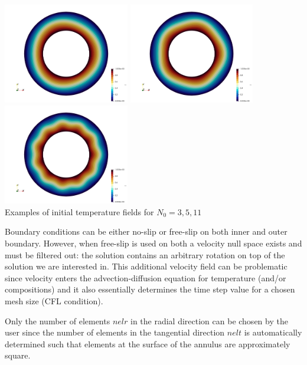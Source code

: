 \begin{center}
\includegraphics[width=5.5cm]{python_codes/fieldstone_33/images/T_N03}
\includegraphics[width=5.5cm]{python_codes/fieldstone_33/images/T_N05}
\includegraphics[width=5.5cm]{python_codes/fieldstone_33/images/T_N11}\\
{\captionfont Examples of initial temperature fields for $N_0=3,5,11$}
\end{center}

Boundary conditions can be either no-slip or free-slip on both inner and outer boundary. 
However, when free-slip is used on both a velocity null space exists and must be filtered out:
the solution contains an arbitrary rotation on top of the solution we are interested in.
This additional velocity field can be problematic since velocity enters the advection-diffusion 
equation for temperature (and/or compositions)
and it also essentially determines the time step value for a chosen mesh size (CFL condition).

Only the number of elements $nelr$ in the radial direction can be chosen by the user
since the number of elements in the tangential direction $nelt$ is automatically determined
such that elements at the surface of the annulus are approximately square.

